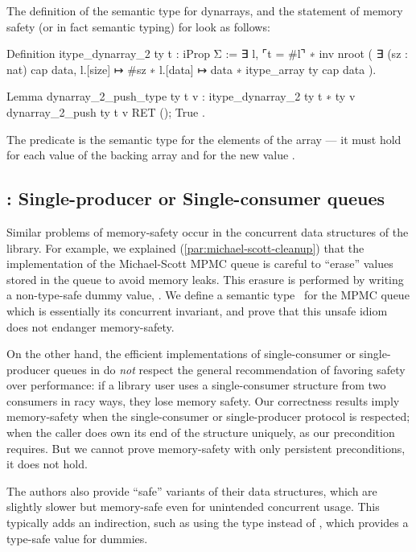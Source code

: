 The definition of the semantic type for dynarrays, and the statement of memory safety (or in fact semantic typing) for  look as follows:
\begin{coqcode}
Definition itype_dynarray_2 ty t : iProp Σ :=
  ∃ l,
  ⌜t = #l⌝ ∗
  inv nroot (
    ∃ (sz : nat) cap data,
    l.[size] ↦ #sz ∗
    l.[data] ↦ data ∗ itype_array ty cap data
  ).

Lemma dynarray_2_push_type ty t v :
  {{{ itype_dynarray_2 ty t ∗ ty v }}}
    dynarray_2_push ty t v
  {{{ RET (); True }}}.
\end{coqcode}

The predicate  is the semantic type for the elements of the array --- it must hold for each value of the backing array and for the new value .

\subsection{\Saturn: Single-producer or Single-consumer queues}

Similar problems of memory-safety occur in the concurrent data structures of the \Saturn library. For example, we explained (\cref{par:michael-scott-cleanup}) that the \Saturn implementation of the Michael-Scott MPMC queue is careful to ``erase'' values stored in the queue to avoid memory leaks. This erasure is performed by writing a non-type-safe dummy value, . We define a semantic type~ for the MPMC queue which is essentially its concurrent invariant, and prove that this unsafe idiom does not endanger memory-safety.

On the other hand, the efficient implementations of single-consumer or single-producer queues in \Saturn do \emph{not} respect the general \OCaml recommendation of favoring safety over performance: if a library user uses a single-consumer structure from two consumers in racy ways, they lose memory safety. Our correctness results imply memory-safety when the single-consumer or single-producer protocol is respected; when the caller does own its end of the structure uniquely, as our precondition requires. But we cannot prove memory-safety with only persistent preconditions, it does not hold.

The \Saturn authors also provide ``safe'' variants of their data structures, which are slightly slower but memory-safe even for unintended concurrent usage. This typically adds an indirection, such as using the type  instead of , which provides a type-safe  value for dummies.

